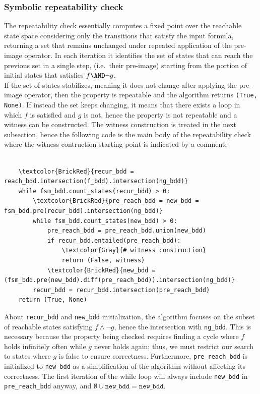 \subsubsection*{Symbolic repeatability check}
The repeatability check essentially computes a fixed point over the reachable state space considering only the transitions that satisfy the input formula, returning a set that remains unchanged under repeated application of the pre-image operator. In each iteration it identifies the set of states that can reach the previous set in a single step, (i.e.\ their pre-image) starting from the portion of initial states that satisfies \(f \AND \neg g\).\\[2ex]
If the set of states stabilizes, meaning it does not change after applying the pre-image operator, then the property is repeatable and the algorithm returns \texttt{(True, None)}. If instead the set keeps changing, it means that there exists a loop in which \(f\) is satisfied and \(g\) is not, hence the property is not repeatable and a witness can be constructed. The witness construction is treated in the next subsection, hence the following code is the main body of the repeatability check where the witness contruction starting point is indicated by a comment:

\begin{scriptsize}
\begin{Verbatim}[commandchars=\\\{\}]

    \textcolor{BrickRed}{recur_bdd = reach_bdd.intersection(f_bdd).intersection(ng_bdd)}
    while fsm_bdd.count_states(recur_bdd) > 0:
        \textcolor{BrickRed}{pre_reach_bdd = new_bdd = fsm_bdd.pre(recur_bdd).intersection(ng_bdd)}
        while fsm_bdd.count_states(new_bdd) > 0:
            pre_reach_bdd = pre_reach_bdd.union(new_bdd)
            if recur_bdd.entailed(pre_reach_bdd):
                \textcolor{Gray}{# witness construction}
                return (False, witness)
            \textcolor{BrickRed}{new_bdd = (fsm_bdd.pre(new_bdd).diff(pre_reach_bdd)).intersection(ng_bdd)}
        recur_bdd = recur_bdd.intersection(pre_reach_bdd)
    return (True, None)

\end{Verbatim}
\end{scriptsize}
About \texttt{recur\_bdd} and \texttt{new\_bdd} initialization, the algorithm focuses on the subset of reachable states satisfying \(f \land \neg g\), hence the intersection with \texttt{ng\_bdd}. This is necessary because the property being checked requires finding a cycle where \(f\) holds infinitely often while \(g\) never holds again; thus, we must restrict our search to states where \(g\) is false to ensure correctness. Furthermore, \texttt{pre\_reach\_bdd} is initialized to \texttt{new\_bdd} as a simplification of the algorithm without affecting its correctness. The first iteration of the while loop will always include \texttt{new\_bdd} in \texttt{pre\_reach\_bdd} anyway, and \(\emptyset \cup \texttt{new\_bdd} = \texttt{new\_bdd}\).
